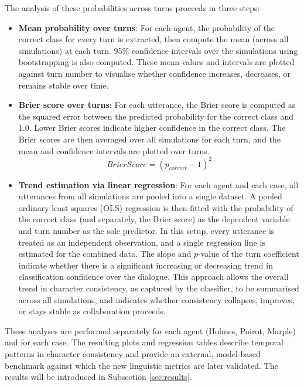\documentclass{article}
\begin{document}
The analysis of these probabilities across turns proceeds in three steps:

\begin{itemize}
    \item \textbf{Mean probability over turns}: For each agent, the probability of the correct class for every turn is extracted, then compute the mean (across all simulations) at each turn. 95\% confidence intervals over the simulations using bootstrapping is also computed. These mean values and intervals are plotted against turn number to visualise whether confidence increases, decreases, or remains stable over time.
    \item \textbf{Brier score over turns}: For each utterance, the Brier score is computed as the squared error between the predicted probability for the correct class and 1.0. Lower Brier scores indicate higher confidence in the correct class. The Brier scores are then averaged over all simulations for each turn, and the mean and confidence intervals are plotted over turns.
    \begin{equation}
        Brier Score = (p_{correct} - 1)^{2}
    \label{eq:brier}
    \end{equation}
    \item \textbf{Trend estimation via linear regression}: For each agent and each case, all utterances from all simulations are pooled into a single dataset. A pooled ordinary least squares (OLS) regression is then fitted with the probability of the correct class (and separately, the Brier score) as the dependent variable and turn number as the sole predictor. In this setup, every utterance is treated as an independent observation, and a single regression line is estimated for the combined data. The slope and $p$-value of the turn coefficient indicate whether there is a significant increasing or decreasing trend in classification confidence over the dialogue. This approach allows the overall trend in character consistency, as captured by the classifier, to be summarised across all simulations, and indicates whether consistency collapses, improves, or stays stable as collaboration proceeds.
\end{itemize}

These analyses are performed separately for each agent (Holmes, Poirot, Marple) and for each case. The resulting plots and regression tables describe temporal patterns in character consistency and provide an external, model-based benchmark against which the new linguistic metrics are later validated. The results will be introduced in Subsection \ref{sec:results}.
\end{document}

